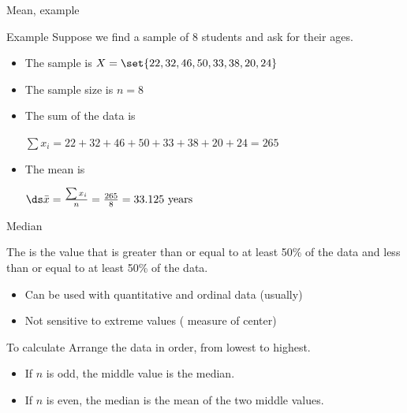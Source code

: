 \documentclass[xcolor=table, aspectratio=169, bigger]{beamer}
\begin{document}
\begin{frame}{Mean, example}
\begin{exampleblock}{Example}
Suppose we find a sample of 8 students and ask for their ages. 

\begin{itemize}
\item The sample is $X = \set{22, 32, 46, 50, 33, 38, 20, 24}$
\pause\item The sample size is $n=8$
\pause
\item The sum of the data is\\
\smallskip
{\centering
$\sum x_i = 22 + 32 + 46 + 50 + 33 +  38 + 20 + 24 = 265$
\par}
\pause
\item The mean is\\
\smallskip
{\centering
$\ds \bar x = \frac {\sum x_i}{n} = \frac {265} 8 = 33.125 \text{ years}$
\par}
\end{itemize}
\smallskip
\end{exampleblock}
\end{frame}

\begin{frame}{Median}
\begin{block}{}
The  is the value that is greater than or equal to at least 50\% of the data and less than or equal to at least 50\% of the data.
\begin{itemize}
\item Can be used with quantitative and ordinal data (usually)
\item Not sensitive to extreme values ( measure of center)
\end{itemize}
\end{block}

\pause
\begin{block}{To calculate}
Arrange the data in order, from lowest to highest.
\begin{itemize}
\item If $n$ is odd, the middle value is the median.
\item If $n$ is even, the median is the mean of the two middle values.
\end{itemize}
\end{block}
\end{frame}
\end{document}
